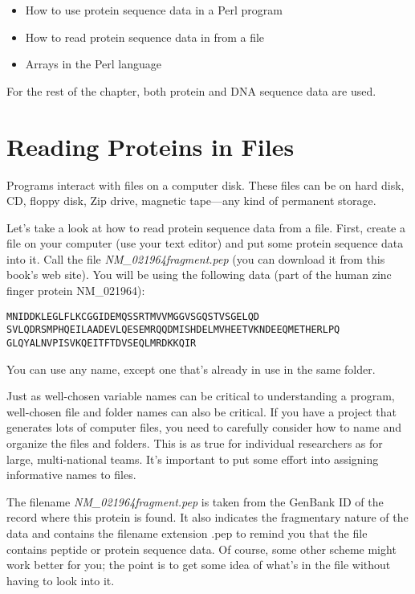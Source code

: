 \begin{itemize}
  \item How to use protein sequence data in a Perl program
  \item How to read protein sequence data in from a file
  \item Arrays in the Perl language
\end{itemize}

For the rest of the chapter, both protein and DNA sequence data are used. 

\section{Reading Proteins in Files}
Programs interact with files on a computer disk. These files can be on hard disk, CD, floppy disk, Zip drive, magnetic tape—any kind of permanent storage.

Let's take a look at how to read protein sequence data from a file.  First, create a file on your computer (use your text editor) and put some protein sequence data into it. Call the file \textit{NM\_021964fragment.pep} (you can download it from this book's web site).  You will be using the following data (part of the human zinc finger protein NM\_021964):

\begin{verbatim}
MNIDDKLEGLFLKCGGIDEMQSSRTMVVMGGVSGQSTVSGELQD
SVLQDRSMPHQEILAADEVLQESEMRQQDMISHDELMVHEETVKNDEEQMETHERLPQ
GLQYALNVPISVKQEITFTDVSEQLMRDKKQIR
\end{verbatim}

You can use any name, except one that's already in use in the same folder.

Just as well-chosen variable names can be critical to understanding a program, well-chosen file and folder names can also be critical. If you have a project that generates lots of computer files, you need to carefully consider how to name and organize the files and folders. This is as true for individual researchers as for large, multi-national teams. It's important to put some effort into assigning informative names to files.

The filename \textit{NM\_021964fragment.pep} is taken from the GenBank ID of the record where this protein is found. It also indicates the fragmentary nature of the data and contains the filename extension .pep to remind you that the file contains peptide or protein sequence data. Of course, some other scheme might work better for you; the point is to get some idea of what's in the file without having to look into it.

